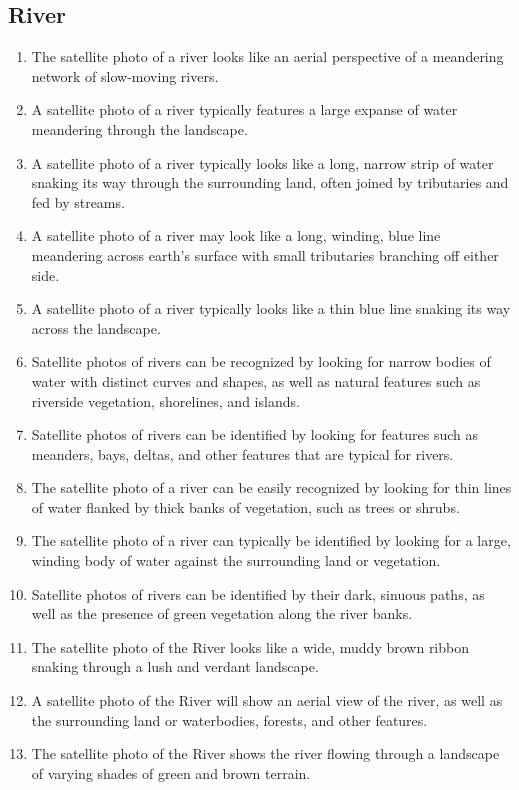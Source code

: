 \documentclass[11pt]{article}
\begin{document}
\subsection{River}
\begin{enumerate}
\item The satellite photo of a river looks like an aerial perspective of a meandering network of slow-moving rivers.
\item A satellite photo of a river typically features a large expanse of water meandering through the landscape.
\item A satellite photo of a river typically looks like a long, narrow strip of water snaking its way through the surrounding land, often joined by tributaries and fed by streams.
\item A satellite photo of a river may look like a long, winding, blue line meandering across earth's surface with small tributaries branching off either side.
\item A satellite photo of a river typically looks like a thin blue line snaking its way across the landscape.
\item Satellite photos of rivers can be recognized by looking for narrow bodies of water with distinct curves and shapes, as well as natural features such as riverside vegetation, shorelines, and islands.
\item Satellite photos of rivers can be identified by looking for features such as meanders, bays, deltas, and other features that are typical for rivers.
\item The satellite photo of a river can be easily recognized by looking for thin lines of water flanked by thick banks of vegetation, such as trees or shrubs.
\item The satellite photo of a river can typically be identified by looking for a large, winding body of water against the surrounding land or vegetation.
\item Satellite photos of rivers can be identified by their dark, sinuous paths, as well as the presence of green vegetation along the river banks.
\item The satellite photo of the River looks like a wide, muddy brown ribbon snaking through a lush and verdant landscape.
\item A satellite photo of the River will show an aerial view of the river, as well as the surrounding land or waterbodies, forests, and other features.
\item The satellite photo of the River shows the river flowing through a landscape of varying shades of green and brown terrain.

\end{enumerate}
\end{document}
